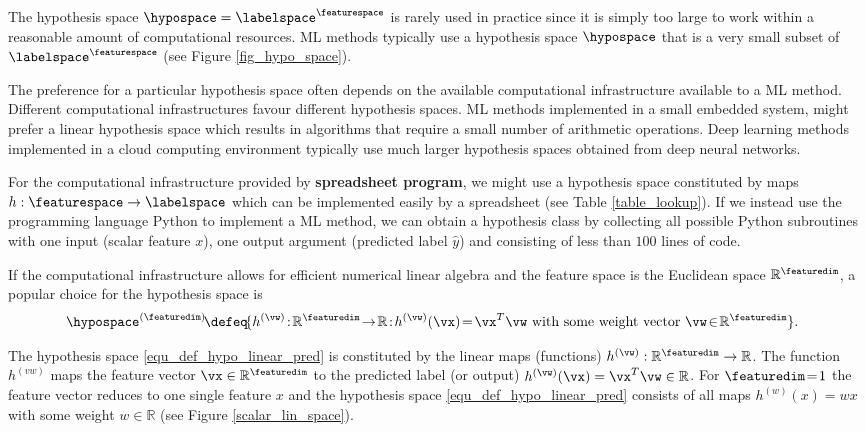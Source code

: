 \documentclass[12pt]{report}
\begin{document}
The hypothesis space  $\hypospace = \labelspace^{\featurespace}$ 
is rarely used in practice since it is simply too large to work 
within a reasonable amount of computational resources.  
ML methods typically use a hypothesis space $\hypospace$ 
that is a very small subset of $\labelspace^{\featurespace}$ (see Figure \ref{fig_hypo_space}). 

The preference for a particular hypothesis space often depends 
on the available computational infrastructure available to a ML method. 
Different computational infrastructures favour different hypothesis 
spaces. ML methods implemented in a small embedded system, might 
prefer a linear hypothesis space which results in algorithms that require 
a small number of arithmetic operations. Deep learning methods 
implemented in a cloud computing environment typically use much larger 
hypothesis spaces obtained from deep neural networks. 

For the computational infrastructure provided by {\bf spreadsheet program}, 
we might use a hypothesis space constituted by maps $h: \featurespace \rightarrow \labelspace$ 
which can be implemented easily by a spreadsheet (see Table \ref{table_lookup}). 
If we instead use the programming language Python to implement 
a ML method, we can obtain a hypothesis class by collecting all possible 
Python subroutines with one input (scalar feature $x$), one output 
argument (predicted label $\hat{y}$) and consisting of less than $100$ 
lines of code. %

If the computational infrastructure allows for efficient numerical 
linear algebra and the feature space is the Euclidean space $\mathbb{R}^{\featuredim}$, 
a popular choice for the hypothesis space is  
\begin{align}
\label{equ_def_hypo_linear_pred}
\hspace*{-3mm}\hypospace^{(\featuredim)} \!\defeq\!\{ h^{(\vw)}\!:\!\mathbb{R}^{\featuredim}\!\rightarrow\!\mathbb{R}\!:\!h^{(\vw)}(\vx)\!=\!\vx^{T} \vw \mbox{ with some weight vector } \vw\!\in\!\mathbb{R}^{\featuredim} \}.  
\end{align}

The hypothesis space \eqref{equ_def_hypo_linear_pred} is constituted 
by the linear maps (functions) $h^{(\vw)}: \mathbb{R}^{\featuredim} \rightarrow \mathbb{R}$. 
The function $h^{(vw)}$ maps the feature vector $\vx \in \mathbb{R}^{\featuredim}$ 
to the predicted label (or output) $h^{(\vw)}(\vx) = \vx^{T} \vw \in \mathbb{R}$. 
For $\featuredim\!=\!1$ the feature vector reduces to one single feature $x$ and 
the hypothesis space \eqref{equ_def_hypo_linear_pred} consists of all maps 
$h^{(w)}(x) = w x$ with some weight $w \in \mathbb{R}$ (see Figure \ref{scalar_lin_space}). 
\end{document}
